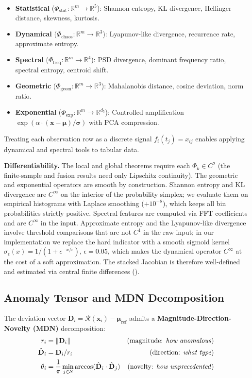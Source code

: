 \documentclass{article}
\newcommand{\R}{\mathbb{R}}
\newcommand{\Nset}{\mathcal{S}}  %
\newcommand{\calR}{\mathcal{R}}
\newcommand{\norm}[1]{\left\lVert#1\right\rVert}
\begin{document}
\begin{itemize}[leftmargin=*]
    \item \textbf{Statistical} ($\Phi_{\text{stat}}: \R^m \to \R^5$): Shannon entropy, KL divergence, Hellinger distance, skewness, kurtosis.
    \item \textbf{Dynamical} ($\Phi_{\text{chaos}}: \R^m \to \R^3$): Lyapunov-like divergence, recurrence rate, approximate entropy.
    \item \textbf{Spectral} ($\Phi_{\text{freq}}: \R^m \to \R^4$): PSD divergence, dominant frequency ratio, spectral entropy, centroid shift.
    \item \textbf{Geometric} ($\Phi_{\text{geom}}: \R^m \to \R^3$): Mahalanobis distance, cosine deviation, norm ratio.
    \item \textbf{Exponential} ($\Phi_{\text{exp}}: \R^m \to \R^{d_5}$): Controlled amplification $\exp(\alpha \cdot (\mathbf{x}-\bm{\mu})/\bm{\sigma})$ with PCA compression.
\end{itemize}

Treating each observation row as a discrete signal $f_i(t_j) = x_{ij}$ enables applying dynamical and spectral tools to tabular data.

\textbf{Differentiability.} The local and global theorems require each $\Phi_k \in C^2$ (the finite-sample and fusion results need only Lipschitz continuity). The geometric and exponential operators are smooth by construction. Shannon entropy and KL divergence are $C^\infty$ on the interior of the probability simplex; we evaluate them on empirical histograms with Laplace smoothing ($+10^{-8}$), which keeps all bin probabilities strictly positive. Spectral features are computed via FFT coefficients and are $C^\infty$ in the input. Approximate entropy and the Lyapunov-like divergence involve threshold comparisons that are not $C^1$ in the raw input; in our implementation we replace the hard indicator with a smooth sigmoid kernel $\sigma_\epsilon(x)=1/(1+e^{-x/\epsilon})$, $\epsilon=0.05$, which makes the dynamical operator $C^\infty$ at the cost of a soft approximation. The stacked Jacobian is therefore well-defined and estimated via central finite differences ().

\subsection{Anomaly Tensor and MDN Decomposition}

The deviation vector $\mathbf{D}_i = \calR(\mathbf{x}_i) - \bm{\mu}_{\text{ref}}$ admits a \textbf{Magnitude-Direction-Novelty (MDN)} decomposition:
\begin{align}
r_i &= \norm{\mathbf{D}_i} & \text{(magnitude: \emph{how anomalous})} \\
\hat{\mathbf{D}}_i &= \mathbf{D}_i / r_i & \text{(direction: \emph{what type})} \\
\theta_i &= \frac{1}{\pi}\min_{j \in \Nset} \arccos(\hat{\mathbf{D}}_i \cdot \hat{\mathbf{D}}_j) & \text{(novelty: \emph{how unprecedented})}
\end{align}
\end{document}
